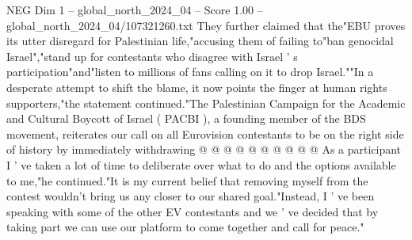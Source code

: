 \begin{textsample}{NEG Dim 1 – global\_north\_2024\_04 – Score 1.00 – global\_north\_2024\_04/107321260.txt}
They further claimed that the"EBU proves its utter disregard for Palestinian life,"accusing them of failing to"ban genocidal Israel","stand up for contestants who disagree with Israel ' s participation"and"listen to millions of fans calling on it to drop Israel.""In a desperate attempt to shift the blame, it now points the finger at human rights supporters,"the statement continued."The Palestinian Campaign for the Academic and Cultural Boycott of Israel ( PACBI ), a founding member of the BDS movement, reiterates our call on all Eurovision contestants to be on the right side of history by immediately withdrawing @ @ @ @ @ @ @ @ @ @ As a participant I ' ve taken a lot of time to deliberate over what to do and the options available to me,"he continued."It is my current belief that removing myself from the contest wouldn't bring us any closer to our shared goal."Instead, I ' ve been speaking with some of the other EV contestants and we ' ve decided that by taking part we can use our platform to come together and call for peace."

\end{textsample}
